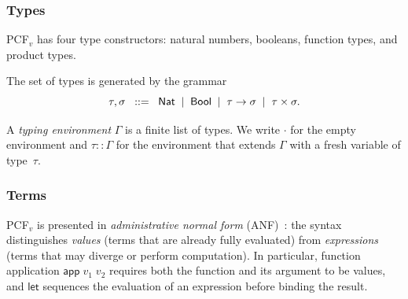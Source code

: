 \subsubsection*{Types}

PCF$_v$ has four type constructors: natural numbers, booleans, function
types, and product types.

\begin{definition}
\label{def:pcfv-types}
The set of types is generated by the grammar
\[
  \tau, \sigma \;\;::=\;\;
  \mathsf{Nat} \;\mid\; \mathsf{Bool} \;\mid\; \tau \to \sigma \;\mid\;
  \tau \times \sigma.
\]
\end{definition}

A \emph{typing environment} $\Gamma$ is a finite list of types.  We write
$\cdot$ for the empty environment and $\tau :: \Gamma$ for the environment
that extends $\Gamma$ with a fresh variable of type~$\tau$.

\subsubsection*{Terms}

PCF$_v$ is presented in \emph{administrative normal form}
(ANF)~\cite{BKV2009}: the syntax distinguishes \emph{values} (terms that
are already fully evaluated) from \emph{expressions} (terms that may
diverge or perform computation).  In particular, function application
$\mathsf{app}\;v_1\;v_2$ requires both the function and its argument to
be values, and $\mathsf{let}$ sequences the evaluation of an expression
before binding the result.


